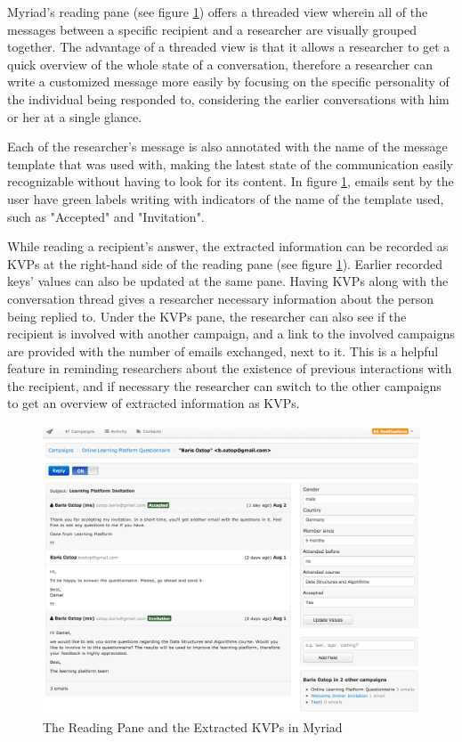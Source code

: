 Myriad's reading pane (see figure \ref{fig:MyriadReadingPane}) offers a threaded view wherein all of the messages between a specific recipient and a researcher are visually grouped together. The advantage of a threaded view is that it allows a researcher to get a quick overview of the whole state of a conversation, therefore a researcher can write a customized message more easily by focusing on the specific personality of the individual being responded to, considering the earlier conversations with him or her at a single glance.
\vspace{1cm}

Each of the researcher's message is also annotated with the name of the message template that was used with, making the latest state of the communication easily recognizable without having to look for its content. In figure \ref{fig:MyriadReadingPane}, emails sent by the user have green labels writing with indicators of the name of the template used, such as "Accepted" and "Invitation".
\vspace{1cm}

While reading a recipient's answer, the extracted information can be recorded as \ac{KVP}s at the right-hand side of the reading pane (see figure \ref{fig:MyriadReadingPane}). Earlier recorded keys' values can also be updated at the same pane. Having \ac{KVP}s along with the conversation thread gives a researcher necessary information about the person being replied to. Under the \ac{KVP}s pane, the researcher can also see if the recipient is involved with another campaign, and a link to the involved campaigns are provided with the number of emails exchanged, next to it. This is a helpful feature in reminding researchers about the existence of previous interactions with the recipient, and if necessary the researcher can switch to the other campaigns to get an overview of extracted information as \ac{KVP}s.

\begin{figure}[htbp]
	\centering
	\includegraphics[width=1.00\textwidth]{imgs/MyriadReadingPane.png}
	\caption[The Reading Pane and the Extracted \ac{KVP}s in Myriad]{The Reading Pane and the Extracted \ac{KVP}s in Myriad}
	\label{fig:MyriadReadingPane}
\end{figure}

